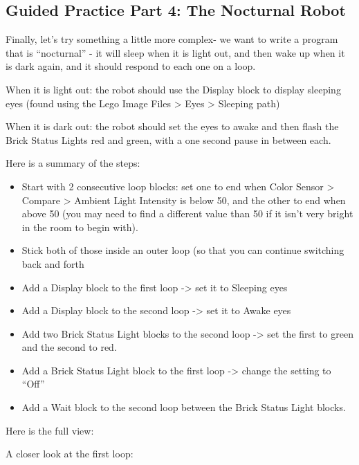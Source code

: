 \documentclass{lessonplan}
\begin{document}
    \subsection{Guided Practice Part 4: The Nocturnal Robot}
        Finally, let’s try something a little more complex- we want to write a program that is “nocturnal” - it will sleep when it is light out, and then wake up when it is dark again, and it should respond to each one on a loop.
        \par
        When it is light out: the robot should use the Display block to display sleeping eyes (found using the Lego Image Files > Eyes > Sleeping path)
        \par
        When it is dark out: the robot should set the eyes to awake and then flash the Brick Status Lights red and green, with a one second pause in between each.
        \par
        Here is a summary of the steps:
        \begin{itemize}
            \item Start with 2 consecutive loop blocks: set one to end when Color Sensor > Compare > Ambient Light Intensity is below 50, and the other to end when above 50 (you may need to find a different value than 50 if it isn’t very bright in the room to begin with).
            \item Stick both of those inside an outer loop (so that you can continue switching back and forth
            \item Add a Display block to the first loop -> set it to Sleeping eyes
            \item Add a Display block to the second loop -> set it to Awake eyes
            \item Add two Brick Status Light blocks to the second loop -> set the first to green and the second to red. 
            \item Add a Brick Status Light block to the first loop -> change the setting to “Off”
            \item Add a Wait block to the second loop between the Brick Status Light blocks.
        \end{itemize}
        
        Here is the full view:
        
        
        A closer look at the first loop:

        
\end{document}
